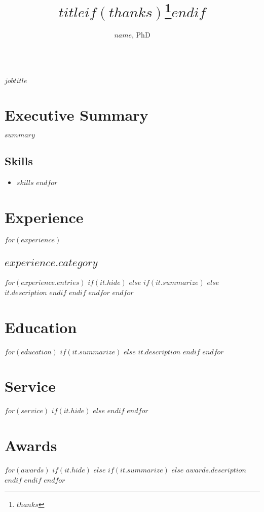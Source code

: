 \documentclass[11pt]{article}
\title{$title$$if(thanks)$\thanks{$thanks$}$endif$}
\author{$name$, PhD}
\date{}
\makeatletter
\renewcommand\maketitle{
    {\noindent\Large\sffamily\bfseries \@author\\
		\large\normalfont\itshape $jobtitle$}
  }
\makeatother
\begin{document}
\maketitle
\thispagestyle{empty}

\section{Executive Summary}
\noindent $summary$
\subsection*{Skills}
\vspace{-10pt}
\begin{multicols}{3}
	\begin{itemize}
		$for(skills)$
		\item $skills$
		$endfor$
	\end{itemize}
\end{multicols}
\titlerule

\section*{Experience}
$for(experience)$
\subsection{$experience.category$}
$for(experience.entries)$
$if(it.hide)$
$else$
$if(it.summarize)$
$else$
$it.description$
$endif$
$endif$
$endfor$
$endfor$

\section*{Education}
$for(education)$
$if(it.summarize)$
$else$
$it.description$
$endif$
$endfor$

\section*{Service}
$for(service)$
$if(it.hide)$
$else$
$endif$
$endfor$

\section*{Awards}
$for(awards)$
$if(it.hide)$
$else$
	$if(it.summarize)$
	$else$
	$awards.description$
	$endif$
$endif$
$endfor$
\end{document}
